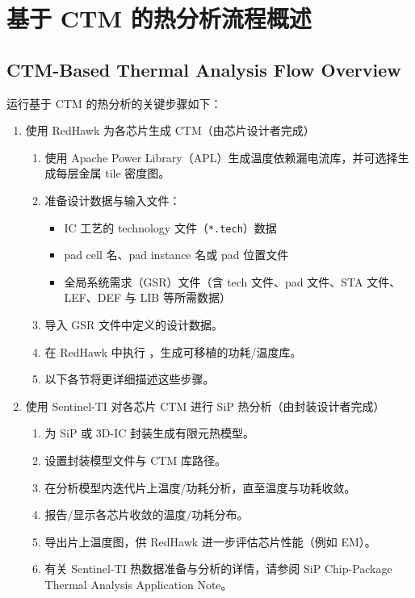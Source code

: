 \label{fig:rh-ctm-flow}

\label{fig:rh-chip-pkg-thermal}

\section{基于 CTM 的热分析流程概述}
\subsection*{CTM-Based Thermal Analysis Flow Overview}

运行基于 CTM 的热分析的关键步骤如下：
\begin{enumerate}
  \item 使用 RedHawk 为各芯片生成 CTM（由芯片设计者完成）
  \begin{enumerate}
    \item 使用 Apache Power Library（APL）生成温度依赖漏电流库，并可选择生成每层金属 tile 密度图。
    \item 准备设计数据与输入文件：
    \begin{itemize}
      \item IC 工艺的 technology 文件（\texttt{*.tech}）数据
      \item pad cell 名、pad instance 名或 pad 位置文件
      \item 全局系统需求（GSR）文件（含 tech 文件、pad 文件、STA 文件、LEF、DEF 与 LIB 等所需数据）
    \end{itemize}
    \item 导入 GSR 文件中定义的设计数据。
    \item 在 RedHawk 中执行 ，生成可移植的功耗/温度库。
    \item 以下各节将更详细描述这些步骤。
  \end{enumerate}
  \item 使用 Sentinel-TI 对各芯片 CTM 进行 SiP 热分析（由封装设计者完成）
  \begin{enumerate}
    \item 为 SiP 或 3D-IC 封装生成有限元热模型。
    \item 设置封装模型文件与 CTM 库路径。
    \item 在分析模型内迭代片上温度/功耗分析，直至温度与功耗收敛。
    \item 报告/显示各芯片收敛的温度/功耗分布。
    \item 导出片上温度图，供 RedHawk 进一步评估芯片性能（例如 EM）。
    \item 有关 Sentinel-TI 热数据准备与分析的详情，请参阅 SiP Chip-Package Thermal Analysis Application Note。
  \end{enumerate}
\end{enumerate}

